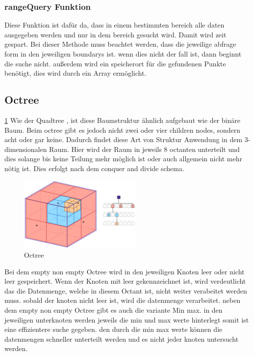 \documentclass[11pt]{article}
\newcommand{\qt}{Quadtree }
\newcommand{\oc}{Octree }
\newcommand{\fett}[1]{{\bf #1}}
\begin{document}
\subsubsection{rangeQuery Funktion} \label{QuerySuche}
Diese Funktion ist dafür da, dass in einem bestimmten bereich alle daten ausgegeben werden und nur in dem bereich gesucht wird. Damit wird zeit gespart. Bei dieser Methode muss beachtet werden, dass die jeweilige abfrage form in den jeweiligen boundarys ist. 
wenn dies nicht der fall ist, dann beginnt die suche nicht. \newline
außerdem wird ein speicherort für die gefundenen Punkte benötigt, dies wird durch ein Array ermöglicht. 

\pagebreak
\subsection{\fett{\oc}} \ref{Octreeexample}
Wie der \qt , ist diese Baumstruktur ähnlich aufgebaut wie der binäre Baum. Beim octree gibt es jedoch nicht zwei oder vier children nodes, sondern acht oder gar keine. Dadurch findet diese Art von Struktur Anwendung in dem 3-dimensionalen Raum. 
Hier wird der Raum in jeweils 8 octanten unterteilt und dies solange bis keine Teilung mehr möglich ist oder auch allgemein nicht mehr nötig ist. Dies erfolgt nach dem conquer and divide schema. 
\begin{figure}[h]
    \begin{center}
    \includegraphics[width=6cm]{octree.png}
    \caption{Octree}
    \label{Octreeexample}
    
\end{center}
\end{figure}
Bei dem empty non empty \oc wird in den jeweiligen Knoten leer oder nicht leer gespeichert. 
Wenn der Knoten mit leer gekennzeichnet ist, wird verdeutlicht das die Datenmenge, welche in diesem Octant ist, nicht weiter verabeitet werden muss. 
sobald der knoten nicht leer ist, wird die datenmenge verarbeitet. 
neben dem empty non empty \oc gibt es auch die variante Min max. 
in den jeweiligen unterknoten werden jeweils die min und max werte hinterlegt somit ist eine effizientere suche gegeben. den durch die min max werte können die datenmengen schneller unterteilt werden und es nicht jeder knoten untersucht werden. 
\end{document}

